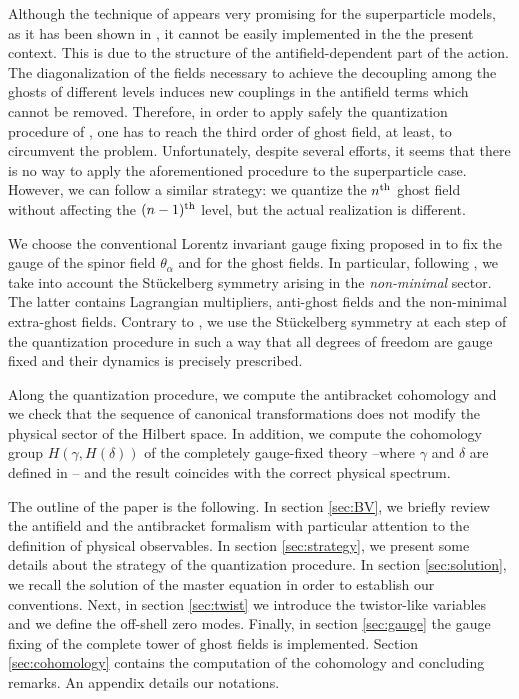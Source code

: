 \documentclass[a4paper,12pt]{article}
\begin{document}
Although the technique of \cite{GPZ} appears very promising for the
superparticle models, as it has been shown in \cite{poli_1}, it cannot
be easily implemented in the the present context. This is due to the
structure of the antifield-dependent part of the action. The
diagonalization of the fields necessary to achieve the decoupling
among the ghosts of different levels induces new couplings in the antifield
terms which cannot be removed. Therefore, in order to apply
safely the quantization procedure of \cite{poli_1,GPZ}, one has to
reach the third order of ghost field, at least, to circumvent the
problem.  Unfortunately, despite several efforts, it seems that there
is no way to apply the aforementioned procedure to the superparticle case.
However, we can follow a similar strategy: we quantize the $n^{\rm th}$
ghost field without affecting the $(n-1)^{\rm th}$ level, but the
actual realization is different.

We choose the conventional Lorentz invariant gauge fixing proposed in
\cite{GH,kallosh,Lindstrom_BS} to fix the gauge of the spinor field
$\theta_\alpha$ and for the ghost fields. In particular, following
\cite{kallosh,stu}, we take into account the St\"uckelberg symmetry
arising in the {\it non-minimal} sector. The latter contains
Lagrangian multipliers, anti-ghost fields and the non-minimal
extra-ghost fields. Contrary to \cite{kallosh,kallo}, we use the
St\"uckelberg symmetry at each step of the quantization procedure in
such a way that all degrees of freedom are gauge fixed and their
dynamics is precisely prescribed.

Along the quantization procedure, we compute the antibracket
cohomology and we check that
the sequence of canonical transformations does not modify the physical
sector of the Hilbert space. In addition, we compute the cohomology
group $H(\gamma,H(\delta))$ of the completely gauge-fixed theory
--where $\gamma$ and $\delta$ are defined in \cite{anti_coho,gomis}--
and the result coincides with the correct physical spectrum.

The outline of the paper is the following. In section \ref{sec:BV}, we
briefly review the antifield and the antibracket formalism with
particular attention to the definition of physical observables. In
section \ref{sec:strategy}, we present some details about the strategy
of the quantization procedure. In section \ref{sec:solution}, we recall
the solution of the master equation in order to establish our
conventions. Next, in section \ref{sec:twist} we introduce the
twistor-like variables and we define the off-shell zero modes.
Finally, in section \ref{sec:gauge} the gauge fixing of the complete
tower of ghost fields is implemented. Section \ref{sec:cohomology}
contains the computation of the cohomology and concluding remarks. An
appendix details our notations.
\end{document}
